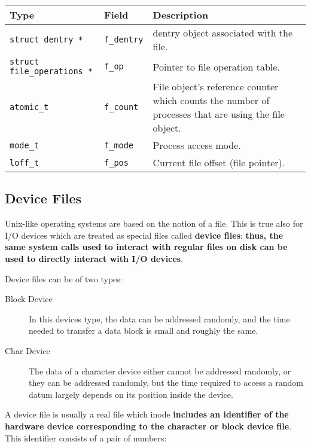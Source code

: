 \documentclass[10pt,a4paper]{article}
\begin{document}
\begin{center}
\begin{tabular}{l|l|p{13cm}} 

\toprule
Type & Field & Description \\
\midrule


\texttt{struct dentry *} & \texttt{f\_dentry} & dentry object associated with the file.

\\
\texttt{struct file\_operations *} & \texttt{f\_op} & Pointer to file operation table.

\\
\texttt{atomic\_t} & \texttt{f\_count} & File object’s reference counter which counts the number of
processes that are using the file object. 

\\
\texttt{mode\_t} & \texttt{f\_mode} & Process access mode.

\\
\texttt{loff\_t} & \texttt{f\_pos} & Current file offset (file pointer).

\\ 
\bottomrule
\end{tabular}
\end{center}

\subsection{Device Files}

Unix-like operating systems are based on the notion of a file. This is true also for I/O devices which are treated as special files called \textbf{device files}; \textbf{thus, the same system calls used to interact with regular files on disk can be used to directly interact with I/O devices}. 

Device files can be of two types: 

\begin{description}
\item[Block Device] In this devices type, the data can be addressed randomly, and the time needed to transfer a data block is small and roughly the same.
\item[Char Device] The data of a character device either cannot be addressed randomly, or they can be addressed randomly, but the time required to access a random datum largely depends on its position inside the device.
\end{description} 

A device file is usually a real file which inode \textbf{includes an identifier of the hardware device corresponding to the character or block device file}. This identifier consists of a pair of numbers:
\end{document}
